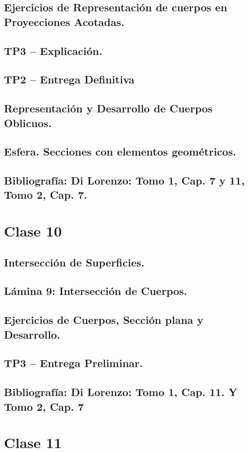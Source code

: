 \documentclass[12pt]{book}
\begin{document}
\section{Ejercicios de Representación de cuerpos en Proyecciones Acotadas.}
\section{TP3 – Explicación.}
\section{TP2 – Entrega Definitiva}
\section{Representación y Desarrollo de Cuerpos Oblicuos.}
\section{Esfera. Secciones con elementos geométricos.}
\section{Bibliografía: Di Lorenzo: Tomo 1, Cap. 7 y 11, Tomo 2, Cap. 7.}

\chapter{Clase 10}
\section{Intersección de Superficies.}
\section{Lámina 9: Intersección de Cuerpos.}
\section{Ejercicios de Cuerpos, Sección plana y Desarrollo.}
\section{TP3 – Entrega Preliminar.}
\section{Bibliografía: Di Lorenzo: Tomo 1, Cap. 11. Y Tomo 2, Cap. 7}

\chapter{Clase 11}
\end{document}

